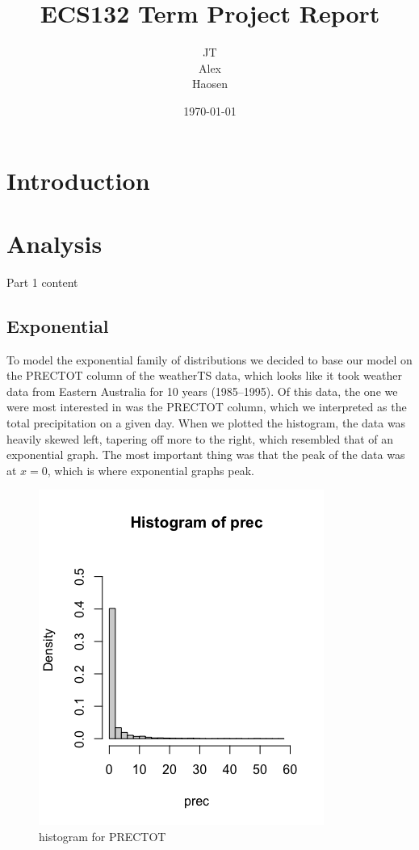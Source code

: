 \documentclass[12pt, a4paper, oneside]{report}
\title{ECS132 Term Project Report}
\author{JT\\Alex\\Haosen}
\date{\today}
\begin{document}
\maketitle
\tableofcontents
\newpage

\chapter{Introduction}

\newpage





\chapter{Analysis}
Part 1 content
\newpage




\section{Exponential}
To model the exponential family of distributions we decided to base our model on the PRECTOT column of the weatherTS data, which looks like it took weather data from Eastern Australia for 10 years (1985--1995).
Of this data, the one we were most interested in was the PRECTOT column, which we interpreted as the total precipitation on a given day.
When we plotted the histogram, the data was heavily skewed left, tapering off more to the right, which resembled that of an exponential graph.
The most important thing was that the peak of the data was at \(x = 0\), which is where exponential graphs peak.

\begin{figure}[h]
    \centering
    \includegraphics[scale=0.5]{images/HistOriginal.png} %
    \caption{histogram for PRECTOT}
\end{figure}
\end{document}
